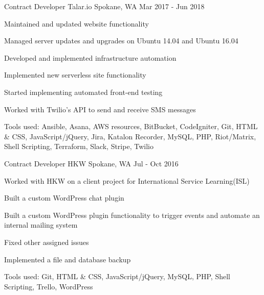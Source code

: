 

\begin{cventries}

  \cventry
    {Contract Developer} %
    {Talar.io} %
    {Spokane, WA} %
    {Mar 2017 - Jun 2018} %
    {
      \begin{cvitems} %
        \item {Maintained and updated website functionality}
        \item {Managed server updates and upgrades on Ubuntu 14.04 and Ubuntu 16.04}
        \item {Developed and implemented infrastructure automation}
        \item {Implemented new serverless site functionality}
        \item {Started implementing automated front-end testing}
        \item {Worked with Twilio's API to send and receive SMS messages}
        \item {Tools used: Ansible, Asana, AWS resources, BitBucket, CodeIgniter, Git, HTML \& CSS, JavaScript/jQuery, Jira, Katalon Recorder, MySQL, PHP, Riot/Matrix, Shell Scripting, Terraform, Slack, Stripe, Twilio}
      \end{cvitems}
    }

  \cventry
    {Contract Developer} %
    {HKW} %
    {Spokane, WA} %
    {Jul - Oct 2016} %
    {
      \begin{cvitems} %
        \item {Worked with HKW on a client project for International Service Learning(ISL)}
        \item {Built a custom WordPress chat plugin}
        \item {Built a custom WordPress plugin functionality to trigger events and automate an internal mailing system}
        \item {Fixed other assigned issues}
        \item {Implemented a file and database backup}
        \item {Tools used: Git, HTML \& CSS, JavaScript/jQuery, MySQL, PHP, Shell Scripting, Trello, WordPress}
      \end{cvitems}
    }


\end{cventries}
